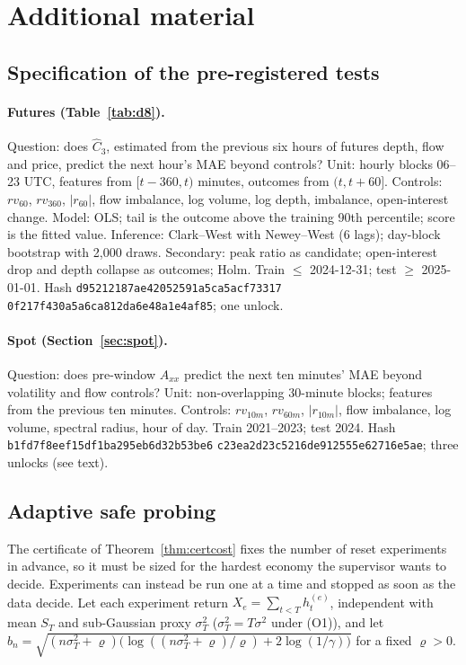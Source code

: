 \documentclass[12pt]{article}
\theoremstyle{definition}
\theoremstyle{remark}
\begin{document}
\section{Additional material}\label{app:ia}

\subsection{Specification of the pre-registered tests}
\paragraph{Futures (Table~\ref{tab:d8}).} Question: does $\hat C_3$, estimated from the previous six hours of futures depth, flow and price, predict the next hour's MAE beyond controls? Unit: hourly blocks 06--23 UTC, features from $[t-360,t)$ minutes, outcomes from $(t,t+60]$. Controls: $rv_{60}$, $rv_{360}$, $|r_{60}|$, flow imbalance, log volume, log depth, imbalance, open-interest change. Model: OLS; tail is the outcome above the training 90th percentile; score is the fitted value. Inference: Clark--West with Newey--West (6 lags); day-block bootstrap with 2,000 draws. Secondary: peak ratio as candidate; open-interest drop and depth collapse as outcomes; Holm. Train $\le$ 2024-12-31; test $\ge$ 2025-01-01. Hash \texttt{d95212187ae42052591a5ca5acf73317} \texttt{0f217f430a5a6ca812da6e48a1e4af85}; one unlock.

\paragraph{Spot (Section~\ref{sec:spot}).} Question: does pre-window $A_{xx}$ predict the next ten minutes' MAE beyond volatility and flow controls? Unit: non-overlapping 30-minute blocks; features from the previous ten minutes. Controls: $rv_{10m}$, $rv_{60m}$, $|r_{10m}|$, flow imbalance, log volume, spectral radius, hour of day. Train 2021--2023; test 2024. Hash \texttt{b1fd7f8eef15df1ba295eb6d32b53be6} \texttt{c23ea2d23c5216de912555e62716e5ae}; three unlocks (see text).

\subsection{Adaptive safe probing}\label{app:probe}
The certificate of Theorem~\ref{thm:certcost} fixes the number of reset experiments in advance, so it must be sized for the hardest economy the supervisor wants to decide. Experiments can instead be run one at a time and stopped as soon as the data decide. Let each experiment return $X_e=\sum_{t<T}h^{(e)}_t$, independent with mean $S_T$ and sub-Gaussian proxy $\sigma_T^2$ ($\sigma_T^2=T\sigma^2$ under (O1)), and let $b_n=\sqrt{(n\sigma_T^2+\varrho)\bigl(\log((n\sigma_T^2+\varrho)/\varrho)+2\log(1/\gamma)\bigr)}$ for a fixed $\varrho>0$.
\end{document}
